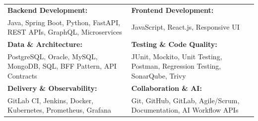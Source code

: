 \renewcommand{\arraystretch}{1.2}

\begin{tabular}{p{} p{}}
    \textbf{Backend Development:} & \textbf{Frontend Development:} \\
    Java, Spring Boot, Python, FastAPI, REST APIs, GraphQL, Microservices & JavaScript, React.js, Responsive UI \\

    \textbf{Data \& Architecture:} & \textbf{Testing \& Code Quality:} \\
    PostgreSQL, Oracle, MySQL, MongoDB, SQL, BFF Pattern, API Contracts & JUnit, Mockito, Unit Testing, Postman, Regression Testing, SonarQube, Trivy \\

    \textbf{Delivery \& Observability:} & \textbf{Collaboration \& AI:} \\
    GitLab CI, Jenkins, Docker, Kubernetes, Prometheus, Grafana & Git, GitHub, GitLab, Agile/Scrum, Documentation, AI Workflow APIs \\
\end{tabular}
